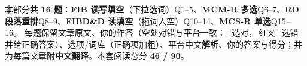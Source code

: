 
\vspace{1mm}
{\small\color{gray} 本部分共 \textbf{16 题}：\textbf{FIB 读写填空}（下拉选词）Q1--5、\textbf{MCM-R 多选}Q6--7、\textbf{RO 段落重排}Q8--9、\textbf{FIBD\&D 读填空}（拖词入空）Q10--14、\textbf{MCS-R 单选}Q15--16。
每题保留文章原文、你的作答（空处对错与平台一致：=选对，{\color{cWrong}}\,红叉=选错并给正确答案）、选项/词库（正确项加粗）、平台中文\textbf{解析}、你的答案与得分；并为每篇文章附\textbf{中文翻译}。本套阅读总分 \textbf{46 / 90}。}
\vspace{2mm}


